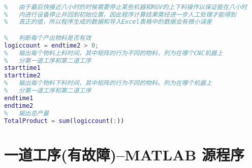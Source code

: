 \documentclass[no-math,withoutpreface,bwprint]{cumcmthesis} %
\numberwithin{equation}{section}
\numberwithin{figure}{section}
\numberwithin{table}{section}
\begin{document}
\begin{lstlisting}[language=matlab]
%   数据输出

%   由于最后快接近八小时的时候需要停止某些机器和RGV的上下料操作以保证能在八小时
%   内进行设备停止并回到初始位置，因此程序计算结果需经进一步人工处理才能得到
%   真正的值，所以程序生成的数据和导入Excel表格中的数据会有微小误差

%   判断每个产出物料是否有效
logiccount = endtime2 > 0;
%   输出每个物料上料时间，其中矩阵的行为不同的物料，列为在哪个CNC机器上
%   分第一道工序和第二道工序
starttime1
starttime2
%   输出每个物料下料时间，其中矩阵的行为不同的物料。列为在哪个机器上
%   分第一道工序和第二道工序
endtime1
endtime2
%   输出总产量
TotalProduct = sum(logiccount(:))
\end{lstlisting}

\section{ 一道工序(有故障)--MATLAB 源程序}
\end{document}
